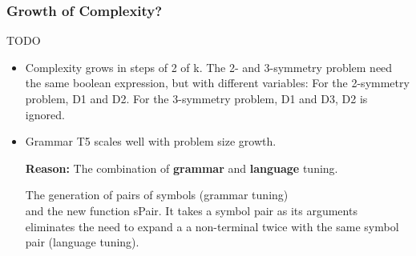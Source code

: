 \begin{frame}
\frametitle{
Growth of Complexity?
}
TODO \begin{itemize}
\item Complexity grows in steps of 2 of k.
       The 2- and 3-symmetry problem need the same boolean expression,
       but with different variables:
       For the 2-symmetry problem, D1 and D2.
       For the 3-symmetry problem, D1 and D3,
       D2 is ignored.
\item Grammar T5 scales well with problem size growth.
 
  {\bf Reason:} The combination of {\bf grammar} and
        {\bf language} tuning.
 
The generation of pairs of symbols
                 (grammar tuning) \\
  and the new function sPair. It takes a 
  symbol pair as its arguments eliminates the need to expand a 
  a non-terminal twice with the same symbol pair
  (language tuning).
\end{itemize}
\end{frame}